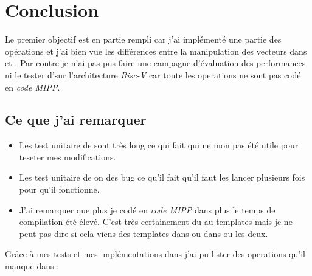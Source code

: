 \section{Conclusion}

Le premier objectif est en partie rempli car j'ai implémenté une partie des opérations et
j'ai bien vue les différences entre la manipulation des vecteurs dans \Eigen et \MIPP.
Par-contre je n'ai pas pus faire une campagne d'évaluation des performances ni le tester
d'\Eigen sur l'architecture \emph{Risc-V} car toute les operations ne sont pas codé en
\emph{code MIPP}.

\subsection{Ce que j'ai remarquer}

\begin{itemize}
  \item Les test unitaire de \Eigen sont très long ce qui fait qui ne mon pas été utile
  pour teseter mes modifications.
  \item Les test unitaire de \Eigen on des bug ce qu'il fait qu'il faut les lancer
  plusieurs fois pour qu'il fonctionne.
  \item J'ai remarquer que plus je codé en \emph{code MIPP} dans \Eigen plus le temps de
  compilation été élevé. C'est très certainement du au templates mais je ne peut pas dire
  si cela viens des templates dans \MIPP ou dans \Eigen ou les deux.
\end{itemize}

Grâce à mes tests et mes implémentations \MIPP dans \Eigen j'ai pu lister des operations
qu'il manque dans \MIPP :

